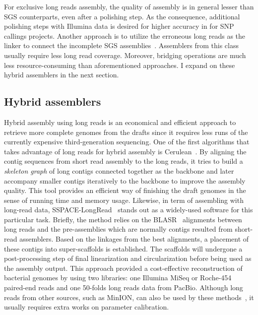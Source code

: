 For exclusive long reads assembly, the quality of assembly is in general lesser than SGS counterparts, even after a polishing step. 
As the consequence, additional polishing steps with Illumina data is desired for higher accuracy in \EG{} for SNP callings projects.
Another approach is to utilize the erroneous long reads as the linker to connect the incomplete SGS assemblies~\cite{DeshpandeFP2013,BoetzerP2014}. Assemblers from this class usually require less long read coverage. Moreover, bridging operations are much less resource-consuming than aforementioned approaches.  I expand on these hybrid assemblers in the next section. 

\subsection{Hybrid assemblers}

Hybrid assembly using long reads is an economical and efficient approach to retrieve more complete genomes from the drafts since it requires less runs of the currently expensive third-generation sequencing. 
One of the first algorithms that takes advantage of long reads for hybrid assembly is Cerulean~\cite{DeshpandeFP2013}. By aligning the contig sequences from short read assembly to the long reads, it tries to build a \emph{skeleton graph} of long contigs connected together as the backbone and later accompany smaller contigs iteratively to the backbone to improve the assembly quality. This tool provides an efficient way of finishing the draft genomes in the sense of running time and memory usage.
Likewise, in term of assembling with long-read data, SSPACE-LongRead~\cite{BoetzerP2014} stands out as a widely-used software for this particular task. 
Briefly, the method relies on the BLASR~\cite{ChaissonT2012} alignments between long reads and the pre-assemblies which are normally contigs resulted from short-read assemblers.
Based on the linkages from the best alignments, a placement of these contigs into super-scaffolds is established. 
The scaffolds will undergone a post-processing step of final linearization and circularization before being used as the assembly output.
This approach provided a cost-effective reconstruction of bacterial genomes by using two libraries: one Illumina MiSeq or Roche-454 paired-end reads and one 50-folds long reads data from PacBio.
Although long reads from other sources, such as MinION, can also be used by these methods~\cite{Karlsson2015}, it usually requires extra works on parameter calibration.

